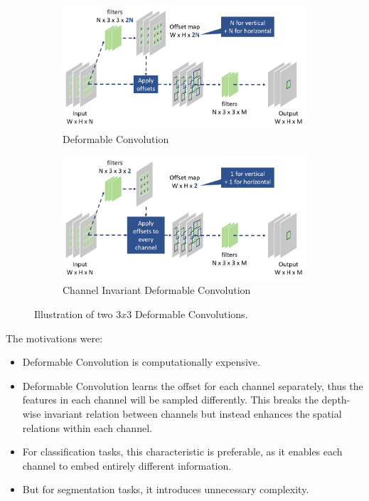 \documentclass[english,report,10pt]{extarticle}
\begin{document}
\begin{itemize}
          \begin{figure}[h]
              \centering
              \begin{subfigure}{0.5\textwidth}
                  \centering
                  \includegraphics[width=0.9\linewidth]{deform-conv.png}
                  \caption{Deformable Convolution}\label{fig:ori-deform}
              \end{subfigure}%
              \begin{subfigure}{0.5\textwidth}
                  \centering
                  \includegraphics[width=0.9\linewidth]{ci-deform-conv.png}
                  \caption{Channel Invariant Deformable Convolution}\label{fig:ci-deform}
              \end{subfigure}
              \caption{Illustration of two $3x3$ Deformable Convolutions.}\label{fig:two-deform}
          \end{figure}

          \newpage
          The motivations were:
          \begin{itemize}
              \item Deformable Convolution is computationally expensive.
              \item Deformable Convolution learns the offset for each channel separately, thus the features in each channel will be sampled differently. This breaks the depth-wise invariant relation between channels but instead enhances the spatial relations within each channel.
              \item For classification tasks, this characteristic is preferable, as it enables each channel to embed entirely different information.
              \item But for segmentation tasks, it introduces unnecessary complexity.
          \end{itemize}
\end{itemize}
\pagebreak
\end{document}
